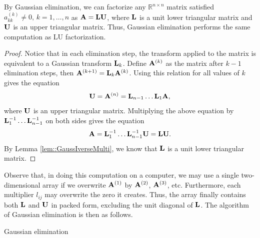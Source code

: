 \begin{lem}
    By Gaussian elimination, we can factorize any $\mathbb{R}^{
    n\times n}$ matrix satisfied $a_{kk}^{(k)}\neq 0,\,
    k=1,\ldots,n$  as $\mathbf{A}={\mathbf{L}}{\mathbf{U}}$, where ${\mathbf{L}}$ is a unit 
    lower triangular matrix and ${\mathbf{U}}$ is an upper triangular 
    matrix. Thus, Gaussian elimination performs the same 
    computation as LU factorization. 
\end{lem}
\begin{proof}
    Notice that in each elimination step, the transform 
    applied to the matrix is equivalent to a Gaussian transform 
    ${\mathbf{L}}_k$. Define ${\mathbf{A}}^{(k)}$ as the matrix after $k-1$ 
    elimination steps, then ${\mathbf{A}}^{(k+1)}={\mathbf{L}}_k{\mathbf{A}}^{(k)}$. 
    Using this relation for all values of $k$ gives the equation
    $$
        {\mathbf{U}} = {\mathbf{A}}^{(n)} = {\mathbf{L}}_{n-1}\ldots{\mathbf{L}}_1{\mathbf{A}},
    $$ 
    where ${\mathbf{U}}$ is an upper triangular matrix. Multiplying 
    the above equation by ${\mathbf{L}}_1^{-1}\ldots{\mathbf{L}}_{n-1}^{-1}$ on both 
    sides gives the equation
    $$
        {\mathbf{A}} = {\mathbf{L}}_1^{-1}\ldots{\mathbf{L}}_{n-1}^{-1}{\mathbf{U}} = {\mathbf{L}}{\mathbf{U}}.
    $$ 
    By Lemma \ref{lem::GaussIverseMulti}, we know that ${\mathbf{L}}$ is 
    a unit lower triangular matrix.
\end{proof}

\begin{alg}
    Observe that, in doing this computation on a computer, we 
    may use a single two-dimensional array if we overwrite 
    ${\mathbf{A}}^{(1)}$ by ${\mathbf{A}}^{(2)}$, ${\mathbf{A}}^{(3)}$, etc. Furthermore, 
    each multiplier $l_{ij}$ may overwrite the zero it creates. 
    Thus, the array finally contains both ${\mathbf{L}}$ and ${\mathbf{U}}$ in 
    packed form, excluding the unit diagonal of ${\mathbf{L}}$. The 
    algorithm of Gaussian elimination is then as follows.
    \IncMargin{1em}
    \begin{algorithm}[H]
        \caption{Gaussian elimination}


        \BlankLine
    \end{algorithm}
    \DecMargin{1em}
\end{alg}


